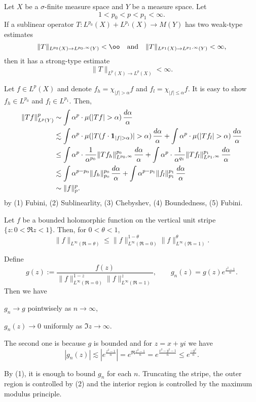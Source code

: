 \documentclass{../crs}
\begin{document}
\begin{thm}
Let $X$ be a $\sigma$-finite measure space and $Y$ be a measure space.
Let
\[1<p_0<p<p_1<\infty.\]
If a sublinear operator $T\colon L^{p_0}(X)+L^{p_1}(X)\to M(Y)$ has two weak-type estimates
\[\|T\|_{L^{p_0}(X)\to L^{p_0,\infty}(Y)}<\oo\quad\text{and}\quad\|T\|_{L^{p_1}(X)\to L^{p_1,\infty}(Y)}<\infty,\]
then it has a strong-type estimate
\[\|T\|_{L^p(X)\to L^p(X)}<\infty.\]
\end{thm}
\begin{pf}
Let $f\in L^p(X)$ and denote $f_h=\chi_{|f|>\alpha}f$ and $f_l=\chi_{|f|\le\alpha}f$.
It is easy to show $f_h\in L^{p_0}$ and $f_l\in L^{p_1}$.
Then,
\begin{align*} %
\|Tf\|_{L^p(Y)}^p&\sim\int\alpha^p\cdot\mu(|Tf|>\alpha)\,\frac{d\alpha}\alpha\\
&\lesssim\int\alpha^p\cdot\mu(|T(f\cdot\1_{|f|>\alpha})|>\alpha)\,\frac{d\alpha}\alpha+\int\alpha^p\cdot\mu(|Tf_l|>\alpha)\,\frac{d\alpha}\alpha\\
&\le\int\alpha^p\cdot\frac1{\alpha^{p_0}}\|Tf_h\|_{L^{p_0,\infty}}^{p_0}\,\frac{d\alpha}\alpha+\int\alpha^p\cdot\frac1{\alpha^{q_1}}\|Tf_l\|_{L^{p_1,\infty}}^{p_1}\,\frac{d\alpha}\alpha\\
&\lesssim\int\alpha^{p-p_0}\|f_h\|_{p_0}^{p_0}\,\frac{d\alpha}\alpha+\int\alpha^{p-p_1}\|f_l\|_{p_1}^{p_1}\,\frac{d\alpha}\alpha\\
&\sim\|f\|_p^p.
\end{align*}
by (1) Fubini, (2) Sublinearlity, (3) Chebyshev, (4) Boundedness, (5) Fubini.
\end{pf}

\begin{thm}
Let $f$ be a bounded holomorphic function on the vertical unit stripe $\{z:0<\Re z<1\}$.
Then, for $0<\theta<1$,
\[\|f\|_{L^\infty(\Re=\theta)}\le\|f\|_{L^\infty(\Re=0)}^{1-\theta}\|f\|_{L^\infty(\Re=1)}^\theta.\]
\end{thm}
\begin{pf}
Define
\[g(z):=\frac{f(z)}{\|f\|_{L^\infty(\Re=0)}^{1-z}\|f\|_{L^\infty(\Re=1)}^z},\qquad g_n(z)=g(z)e^\frac{z^2-1}n.\]
Then we have
\begin{cond}
\item $g_n\to g$ pointwisely as $n\to\infty$,
\item $g_n(z)\to0$ uniformly as $\Im z\to\infty$.
\end{cond}
The second one is because $g$ is bounded and for $z=x+yi$ we have
\[|g_n(z)|\lesssim|e^\frac{z^2-1}n|=e^{\Re\frac{z^2-1}n}=e^\frac{x^2-y^2-1}n\le e^\frac{-y^2}n.\]

By (1), it is enough to bound $g_n$ for each $n$.
Truncating the stripe, the outer region is controlled by (2) and the interior region is controlled by the maximum modulus principle.
\end{pf}
\end{document}

